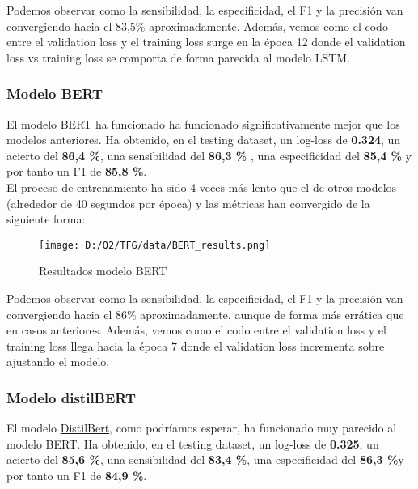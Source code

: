 \documentclass[10pt,riqno,a4paper,twoside]{article}\usepackage[]{graphicx}\usepackage[]{color}
\begin{document}
Podemos observar como la sensibilidad, la especificidad, el F1 y la precisión van convergiendo hacia el 83,5\% aproximadamente. Además, vemos como el codo entre el validation loss y el training loss surge en la época 12 donde el validation loss vs training loss se comporta de forma parecida al modelo LSTM.

\subsubsection{Modelo BERT}

El modelo \hyperref[BERT_model]{BERT} ha funcionado ha funcionado significativamente mejor que los modelos anteriores. Ha obtenido, en el testing dataset, un log-loss de \textbf{0.324}, un acierto del \textbf{86,4 \%}, una sensibilidad del \textbf{86,3 \%} , una especificidad del \textbf{85,4 \%} y por tanto un F1 de \textbf{85,8 \%}. \\

El proceso de entrenamiento ha sido 4 veces más lento que el de otros modelos (alrededor de 40 segundos por época) y las métricas han convergido de la siguiente forma: 

\begin{figure}[h]
\caption{Resultados modelo BERT}
\begin{center}
\texttt{[image: D:/Q2/TFG/data/BERT\_results.png]}
\end{center}

\end{figure}

Podemos observar como la sensibilidad, la especificidad, el F1 y la precisión van convergiendo hacia el 86\% aproximadamente, aunque de forma más errática que en casos anteriores. Además, vemos como el codo entre el validation loss y el training loss llega hacia la época 7 donde el validation loss incrementa sobre ajustando el modelo.


\subsubsection{Modelo distilBERT}

El modelo \hyperref[distilBERT_model]{DistilBert}, como podríamos esperar, ha funcionado muy parecido al modelo BERT. Ha obtenido, en el testing dataset, un log-loss de \textbf{0.325}, un acierto del \textbf{85,6 \%}, una sensibilidad del \textbf{83,4 \%}, una especificidad del \textbf{86,3 \%}y por tanto un F1 de \textbf{84,9 \%}. \\
\end{document}
